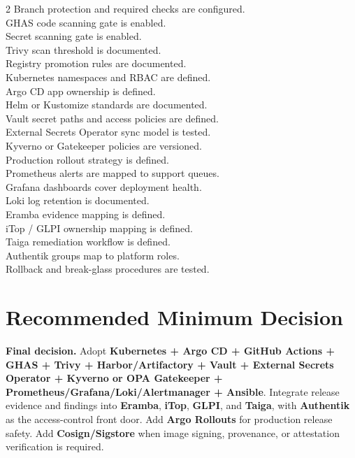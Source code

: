\documentclass[10pt,letterpaper]{article}
\newcommand{\checkbox}{\makebox[1.2em][l]{\(\square\)}}
\newcommand{\tool}[1]{\textbf{#1}}
\begin{document}
\begin{multicols}{2}
\checkbox Branch protection and required checks are configured.\\
\checkbox GHAS code scanning gate is enabled.\\
\checkbox Secret scanning gate is enabled.\\
\checkbox Trivy scan threshold is documented.\\
\checkbox Registry promotion rules are documented.\\
\checkbox Kubernetes namespaces and RBAC are defined.\\
\checkbox Argo CD app ownership is defined.\\
\checkbox Helm or Kustomize standards are documented.\\
\checkbox Vault secret paths and access policies are defined.\\
\checkbox External Secrets Operator sync model is tested.\\
\checkbox Kyverno or Gatekeeper policies are versioned.\\
\checkbox Production rollout strategy is defined.\\
\checkbox Prometheus alerts are mapped to support queues.\\
\checkbox Grafana dashboards cover deployment health.\\
\checkbox Loki log retention is documented.\\
\checkbox Eramba evidence mapping is defined.\\
\checkbox iTop / GLPI ownership mapping is defined.\\
\checkbox Taiga remediation workflow is defined.\\
\checkbox Authentik groups map to platform roles.\\
\checkbox Rollback and break-glass procedures are tested.\\
\end{multicols}

\section{Recommended Minimum Decision}

\begin{riskbox}
\textbf{Final decision.} Adopt \tool{Kubernetes + Argo CD + GitHub Actions + GHAS + Trivy + Harbor/Artifactory + Vault + External Secrets Operator + Kyverno or OPA Gatekeeper + Prometheus/Grafana/Loki/Alertmanager + Ansible}. Integrate release evidence and findings into \tool{Eramba}, \tool{iTop}, \tool{GLPI}, and \tool{Taiga}, with \tool{Authentik} as the access-control front door. Add \tool{Argo Rollouts} for production release safety. Add \tool{Cosign/Sigstore} when image signing, provenance, or attestation verification is required.
\end{riskbox}
\end{document}

